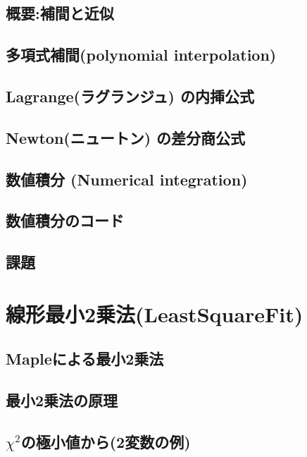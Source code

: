 \documentclass[10pt,a4j]{jsbook}
\begin{document}
\section{概要:補間と近似}
 
\section{多項式補間(polynomial interpolation)}
 
\section{Lagrange(ラグランジュ) の内挿公式}
 
\section{Newton(ニュートン) の差分商公式}
 
\section{数値積分 (Numerical integration)}
 
\section{数値積分のコード}
 
\section{課題}
 

\chapter{線形最小2乗法(LeastSquareFit)}
\section{Mapleによる最小2乗法}
 
\section{最小2乗法の原理}
 
\section{$\chi^2$の極小値から(2変数の例)}
 
\end{document}
